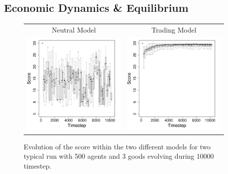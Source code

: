 \documentclass[a0paper,landscape,showframe]{baposter}
\begin{document}
\begin{poster}
{\begin{multicols}{2}
\subsection*{Economic Dynamics \& Equilibrium}



\begin{figure}[H]
	\centering
	\begin{tabular}{ c c}
		 Neutral Model & Trading Model \\
		 \includegraphics[width=5cm]{img/ScoreEvolutionForRandom-G3N500.pdf}
		 & \includegraphics[width=5cm]{img/ScoreEvolutionForTrade-G3N500.pdf}

	\end{tabular}
	\caption{Evolution of the score within the two different models for two typical run with 500 agents and 3 goods evolving during 10000 timestep.}%
	\label{fig:scoreEvol}
\end{figure}


\end{multicols}}
\end{poster}
\end{document}
